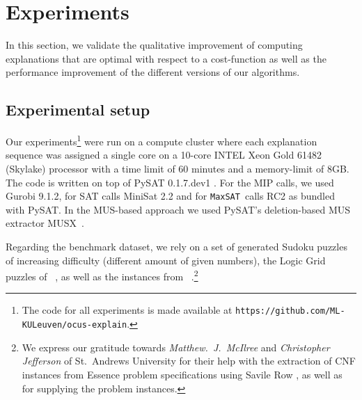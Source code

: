 \documentclass[twoside,11pt]{article}
\newcommand\citet[1]{\citeauthor{#1}~\citeyear{#1}}
\newcommand\comment[1]{\marginpar{\tiny #1}}
\renewcommand\comment[1]{#1}
\newcommand{\emilio}[1]{{\comment{\color{red}Emilio: #1}}}
\newcommand{\bart}[1]{{\comment{\color{OliveGreen}Bart: #1}}}
\newcommand\maxsat{\texttt{MaxSAT}}
\begin{document}
\section{Experiments}\label{sec:experiments}

In this section, we validate the qualitative improvement of computing explanations that are optimal with respect to a cost-function as well as the performance improvement of the different versions of our algorithms.

\subsection*{Experimental setup}

Our experiments\footnote{The code for all experiments is made available at \texttt{https://github.com/ML-KULeuven/ocus-explain}.} were run on a compute cluster where each explanation sequence was assigned a single core on a 10-core INTEL Xeon Gold 61482 (Skylake) processor with a time limit of 60 minutes and a memory-limit of 8GB. The code is written on top of PySAT 0.1.7.dev1 \cite{pysat}.
For the MIP calls, we used Gurobi 9.1.2, for SAT calls MiniSat 2.2 and for \maxsat~calls RC2 as bundled with PySAT.
In the MUS-based approach we used PySAT’s deletion-based MUS extractor MUSX~\cite{marques2010minimal}. 

Regarding the benchmark dataset, we rely on a set of generated Sudoku puzzles of increasing difficulty (different amount of given numbers), the Logic Grid puzzles of \citet{bogaerts2021framework}, as well as the instances from \citet{schotten}.\footnote{We express our gratitude towards \emph{Matthew.~J.~McIlree} and \emph{Christopher Jefferson} of St.~Andrews University for their help with the extraction of CNF instances from Essence problem specifications \cite{frisch2008essence} using Savile Row \cite{nightingale2017automatically}, as well as for supplying the problem instances.}
\end{document}
